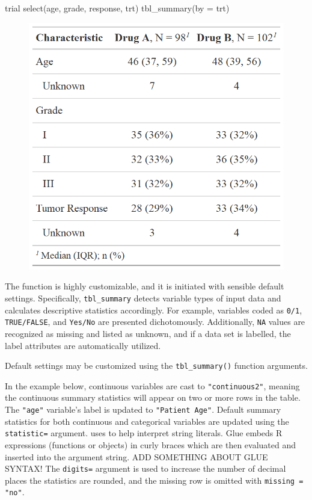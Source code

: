 \begin{example}
trial %
  select(age, grade, response, trt) %
  tbl_summary(by = trt)
\end{example}
\begin{figure}[h!]
  \includegraphics[scale=0.28]{summary_basic.png}
  \centering
\end{figure}

The function is highly customizable, and it is initiated with sensible default settings.
Specifically, \texttt{tbl\_summary} detects variable types of input data and calculates descriptive statistics accordingly.
For example, variables coded as \texttt{0/1}, \texttt{TRUE/FALSE}, and \texttt{Yes/No} are presented dichotomously.
Additionally, \texttt{NA} values are recognized as missing and listed as unknown, and if a data set is labelled, the label attributes are automatically utilized. 

Default settings may be customized using the \texttt{tbl\_summary()} function arguments.



In the example below, continuous variables are cast to \texttt{"continuous2"}, meaning the continuous summary statistics will appear on two or more rows in the table.
The \texttt{"age"} variable's label is updated to \texttt{"Patient Age"}.
Default summary statistics for both continuous and categorical variables are updated using the \texttt{statistic=} argument. 
 uses  to help interpret string literals. Glue embeds R expressions (functions or objects) in curly braces which are then evaluated and inserted into the argument string. 
ADD SOMETHING ABOUT GLUE SYNTAX!
The \texttt{digits=} argument is used to increase the number of decimal places the statistics are rounded, and the missing row is omitted with \texttt{missing = "no"}.

